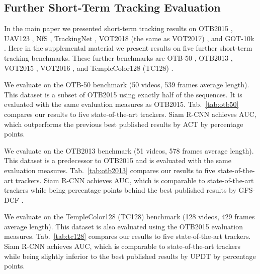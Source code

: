 \documentclass[10pt,twocolumn,letterpaper]{article}
\newcommand{\PAR}[1]{\vskip1pt \noindent {\bf #1~}}
\begin{document}
\subsection{Further Short-Term Tracking Evaluation}
In the main paper we presented short-term tracking results on OTB2015 \cite{Wu15TPAMI}, UAV123 \cite{Mueller16ECCV}, NfS \cite{Galoogahi17ICCV}, TrackingNet \cite{Muller18ECCV}, VOT2018 (the same as VOT2017) \cite{Kristan18ECCVW}, and GOT-10k \cite{Huang18Arxiv}. Here in the supplemental material we present results on five further short-term tracking benchmarks. 
These further benchmarks are OTB-50 \cite{Wu15TPAMI}, OTB2013 \cite{Wu13CVPR}, VOT2015 \cite{Kristan15ICCVW}, VOT2016 \cite{Kristan16ECCVW}, and TempleColor128 (TC128) \cite{Liang15TIP}.

\PAR{OTB-50.} We evaluate on the OTB-50 benchmark \cite{Wu15TPAMI} (50 videos, 539 frames average length). This dataset is a subset of OTB2015 using exactly half of the sequences. It is evaluated with the same evaluation measures as OTB2015. Tab.~\ref{tab:otb50} compares our results to five state-of-the-art trackers.
Siam R-CNN achieves  AUC, which outperforms the previous best published results by ACT \cite{Chen18ECCV_Actor} by  percentage points. 

\PAR{OTB2013.} We evaluate on the OTB2013 benchmark \cite{Wu13CVPR} (51 videos, 578 frames average length). This dataset is a predecessor to OTB2015 and is evaluated with the same evaluation measures. Tab.~\ref{tab:otb2013} compares our results to five state-of-the-art trackers.
Siam R-CNN achieves  AUC, which is comparable to state-of-the-art trackers while being  percentage points behind the best published results by GFS-DCF \cite{Xu19ICCV}. 

\PAR{TC128.} We evaluate on the TempleColor128 (TC128) benchmark \cite{Liang15TIP} (128 videos, 429 frames average length). This dataset is also evaluated using the OTB2015 evaluation measures. Tab.~\ref{tab:tc128} compares our results to five state-of-the-art trackers.
Siam R-CNN achieves  AUC, which is comparable to state-of-the-art trackers while being slightly inferior to the best published results by UPDT \cite{Bhat18ECCV} by  percentage points. 
\end{document}
